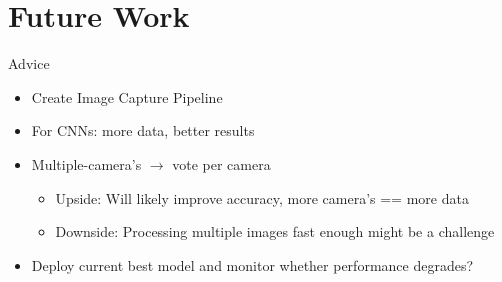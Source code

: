 \documentclass{beamer}
\begin{document}
\section{Future Work}
\begin{frame}{Advice}
\begin{itemize}
  \item Create Image Capture Pipeline
  \item For CNNs: more data, better results
  \item Multiple-camera's $\rightarrow$ vote per camera
  \begin{itemize}
  \item Upside: Will likely improve accuracy, more camera's == more data
  \item Downside: Processing multiple images fast enough might be a challenge 
  \end{itemize}
  \item Deploy current best model and monitor whether performance degrades?
\end{itemize}
\end{frame}{}
\end{document}
